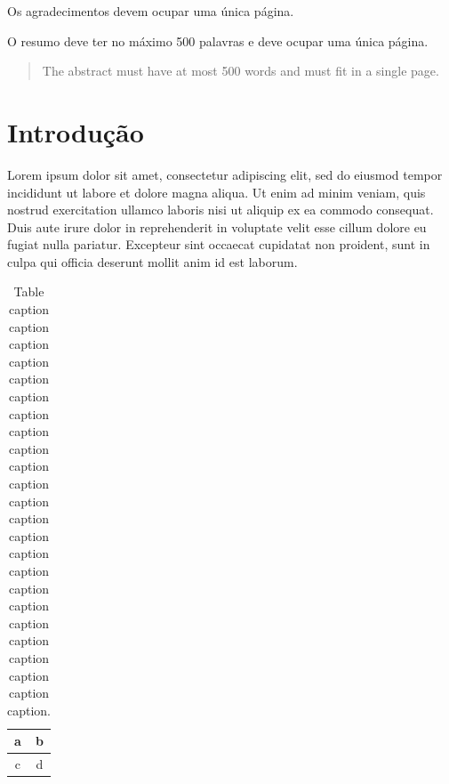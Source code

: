 \documentclass[Ingles]{feec-tese-v1}
\begin{document}
Os agradecimentos devem ocupar uma única página.


\begin{resumo}
O resumo deve ter no máximo 500 palavras e deve ocupar uma única página.
\end{resumo}


\begin{abstract}
The abstract must have at most 500 words and must fit in a single page.
\end{abstract}




\listoffigures

\listoftables





\tableofcontents


\fimdaspaginasiniciais
\fi
\resetlang

\chapter{Introdução}

Lorem ipsum dolor sit amet, consectetur adipiscing elit, sed do eiusmod
tempor incididunt ut labore et dolore magna aliqua. Ut enim ad minim
veniam, quis nostrud exercitation ullamco laboris nisi ut aliquip ex ea
commodo consequat. Duis aute irure dolor in reprehenderit in voluptate
velit esse cillum dolore eu fugiat nulla pariatur. Excepteur sint occaecat
cupidatat non proident, sunt in culpa qui officia deserunt mollit anim id
est laborum.

\begin{table}
\caption[Shorter table caption]{Table caption caption caption caption
  caption caption caption caption caption caption caption caption caption
  caption caption caption caption caption caption caption caption caption
  caption caption.}
\label{t:label0}
\begin{center}
\begin{tabular}{|c|c|}
\hline
a & b \\\hline
c & d \\\hline
\end{tabular}
\end{center}
\end{table}
\end{document}
